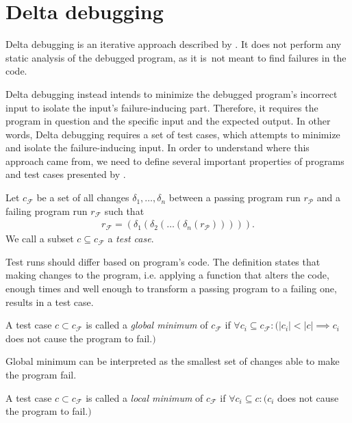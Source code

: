 \section{Delta debugging}

Delta debugging is an iterative approach described by \citet{Zeller99}.
It does not perform any static analysis of the debugged program, as it 
is~not meant to find failures in the code. 

Delta debugging instead intends to 
minimize the debugged program's incorrect input to isolate the input's 
failure-inducing part. 
Therefore, it requires the program in question and the specific input 
and the expected output. 
In other words, Delta debugging requires a set of test cases, which attempts to 
minimize and isolate the failure-inducing input. 
In order to understand where
this app\-roach came from, we need to define several important properties of 
programs and test cases presented by \citet{Zeller02}.

\begin{defn}\label{def02:1}
  Let $c_\mathcal{F}$ be a set of all changes $\delta_1,\dots,\delta_n$ 
  between a passing program run $r_\mathcal{P}$ and a failing program run
  $r_\mathcal{F}$ such that 
  \begin{align}
	r_\mathcal{F} = (\delta_1(\delta_2(\dots(\delta_n(r_\mathcal{P}))))). \nonumber 
  \end{align}
  We call a subset $c \subseteq c_\mathcal{F}$ a \emph{test case}.
\end{defn}

Test runs should differ based on program's code. 
The definition states that making changes to the program,
i.e. applying a function that alters the code, enough times
and well enough to transform a passing program to a failing one,
results in a test case.

\begin{defn}\label{def02:2}
  A test case $c \subset c_\mathcal{F}$ is called a \emph{global minimum}
  of $c_\mathcal{F}$ if $\forall c_i \subseteq c_\mathcal{F}:
  (|c_i| < |c| \implies c_i$ does not cause the program to fail.$)$
\end{defn}

Global minimum can be interpreted as the smallest set of changes able to
make the program fail.

\begin{defn}\label{def02:3}
  A test case $c \subset c_\mathcal{F}$ is called a \emph{local minimum}
  of $c_\mathcal{F}$ if $\forall c_i \subseteq c:
  (c_i$ does not cause the program to fail.$)$
\end{defn}

